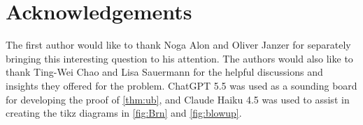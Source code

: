 \documentclass[reqno]{amsart}
\theoremstyle{remark}
\theoremstyle{definition}
\numberwithin{theorem}{section}
\begin{document}
\section*{Acknowledgements}
The first author would like to thank Noga Alon and Oliver Janzer for separately bringing this interesting question to his attention. The authors would also like to thank Ting-Wei Chao and Lisa Sauermann for the helpful discussions and insights they offered for the problem. ChatGPT 5.5 was used as a sounding board for developing the proof of \cref{thm:ub}, and Claude Haiku 4.5 was used to assist in creating the tikz diagrams in \cref{fig:Brn} and \cref{fig:blowup}.

\printbibliography
\end{document}
